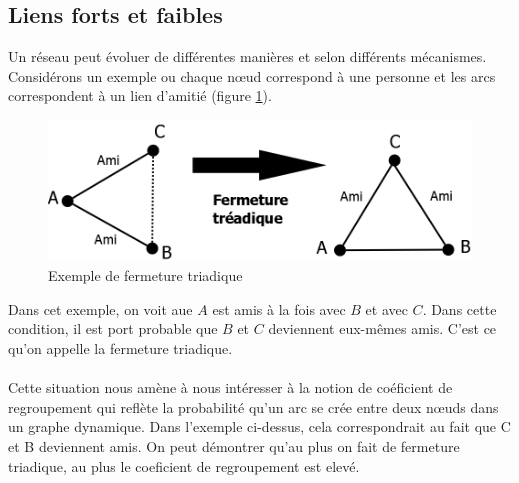 \subsection{Liens forts et faibles}
Un réseau peut évoluer de différentes manières et selon différents mécanismes.
Considérons un exemple ou chaque n\oe ud correspond à une personne et les arcs correspondent à un lien d'amitié (figure \ref{fermeture_triadique}).
	\begin{figure}
	\center
	\includegraphics[scale=0.5]{images/18_fermeture_triadique.png}
	\caption{\label{fermeture_triadique} Exemple de fermeture triadique}
	\end{figure}
Dans cet exemple, on voit aue $A$ est amis à la fois avec $B$ et avec $C$. Dans cette condition, il est port probable que $B$ et $C$ deviennent eux-mêmes amis. C'est ce qu'on appelle la fermeture triadique.\\
\\
Cette situation nous amène à nous intéresser à la notion de coéficient de regroupement qui reflète la probabilité qu'un arc se crée entre deux n\oe uds dans un graphe dynamique. 
Dans l'exemple ci-dessus, cela correspondrait au fait que C et B deviennent amis. On peut démontrer qu'au plus on fait de fermeture triadique, au plus le coeficient de regroupement est elevé.

